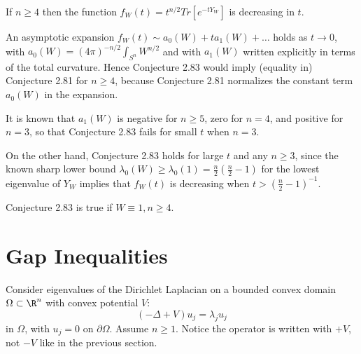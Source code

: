 \documentclass[12pt,letterpaper, reqno]{amsart}
\begin{document}
\begin{problemblock}

\begin{conjecture}[2.83] 
 If $n \geq 4$ then the
function $f_W(t) = t^{n/2} {Tr}[e^{-tY_W}]$ is decreasing in
$t$.
\end{conjecture}


\begin{remark}
An asymptotic expansion $f_W(t) \sim a_0(W)+ t a_1(W)+\ldots$ holds
as $t \to 0$, with $a_0(W)= (4\pi)^{-n/2} \int_{S^n} W^{n/2}$ and
with $a_1(W)$ written explicitly in terms of the total curvature.
Hence Conjecture 2.83 would imply (equality in) Conjecture 2.81 for $n
\geq 4$, because Conjecture 2.81 normalizes the constant term $a_0(W)$
in the expansion.
\end{remark}

\begin{remark}
It is known that $a_1(W)$ is negative for $n \geq 5$, zero for
$n=4$, and positive for $n=3$, so that Conjecture 2.83 fails for small
$t$ when $n=3$.

On the other hand, Conjecture 2.83 holds for large $t$ and any $n \geq
3$, since the known sharp lower bound $\lambda_0(W) \geq
\lambda_0(1)= \frac{n}{2} \left( \frac{n}{2}-1 \right)$ for the
lowest eigenvalue of $Y_W$ implies that $f_W(t)$ is decreasing when
$t > \left( \frac{n}{2}-1 \right)^{-1}$.
\end{remark}

\begin{remark}
Conjecture 2.83 is true if $W \equiv 1, n \geq 4$.
\end{remark}


\end{problemblock}

\section{Gap Inequalities}

 Consider eigenvalues of the
Dirichlet Laplacian on a bounded convex domain $\Omega \subset \R^n$
with convex potential $V$:
\[
(-\Delta + V) u_j = \lambda_j u_j 
\]
in $\Omega$, with $u_j = 0 $ on $\partial \Omega$.
Assume $n \geq 1$. Notice the operator is written with $+V$, not
$-V$ like in the previous section.
\end{document}
